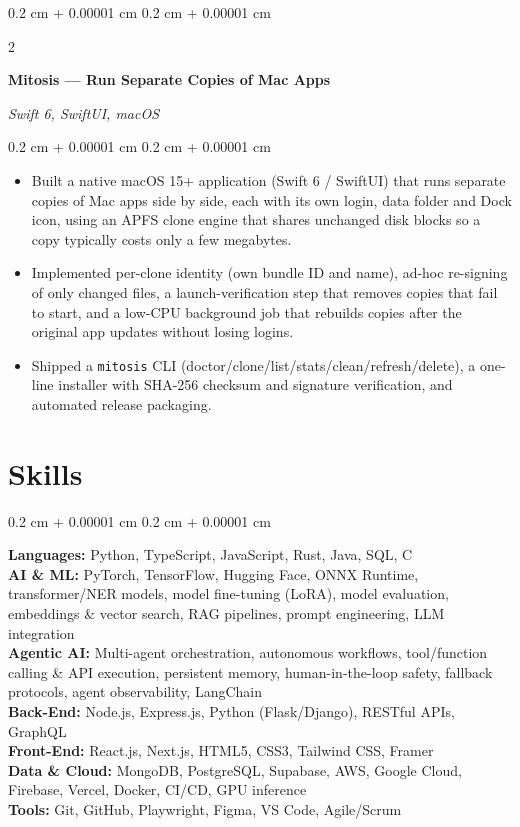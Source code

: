 \documentclass[10pt, letterpaper]{article}
\newenvironment{highlights}{
    \begin{itemize}[
        topsep=0.10 cm,
        parsep=0.10 cm,
        partopsep=0pt,
        itemsep=0pt,
        leftmargin=0.4 cm + 10pt
    ]
}{
    \end{itemize}
} %
\newenvironment{onecolentry}{
    \begin{adjustwidth}{
        0.2 cm + 0.00001 cm
    }{
        0.2 cm + 0.00001 cm
    }
}{
    \end{adjustwidth}
} %
\newenvironment{twocolentry}[2][]{
    \onecolentry
    \def\secondColumn{#2}
    \setcolumnwidth{\fill, 5.0 cm}
    \begin{paracol}{2}
}{
    \switchcolumn \raggedleft \secondColumn
    \end{paracol}
    \endonecolentry
} %
\let\hrefWithoutArrow\href
\renewcommand{\href}[2]{\hrefWithoutArrow{#1}{\ifthenelse{\equal{#2}{}}{ }{#2 }\raisebox{.15ex}{\footnotesize \faExternalLink*}}}
\begin{document}
    \vspace{0.12 cm}
    \begin{twocolentry}{
        \textit{Swift 6, SwiftUI, macOS}
    }
        \textbf{Mitosis --- Run Separate Copies of Mac Apps} \href{https://github.com/deadhearth01/Mitosis}{\faGithub}
    \end{twocolentry}
    \vspace{0.10 cm}
    \begin{onecolentry}
        \begin{highlights}
            \item Built a native macOS 15+ application (Swift 6 / SwiftUI) that runs separate copies of Mac apps side by side, each with its own login, data folder and Dock icon, using an APFS clone engine that shares unchanged disk blocks so a copy typically costs only a few megabytes.
            \item Implemented per-clone identity (own bundle ID and name), ad-hoc re-signing of only changed files, a launch-verification step that removes copies that fail to start, and a low-CPU background job that rebuilds copies after the original app updates without losing logins.
            \item Shipped a \texttt{mitosis} CLI (doctor/clone/list/stats/clean/refresh/delete), a one-line installer with SHA-256 checksum and signature verification, and automated release packaging.
        \end{highlights}
    \end{onecolentry}

    \section{Skills}
    \begin{onecolentry}
        \textbf{Languages:} Python, TypeScript, JavaScript, Rust, Java, SQL, C \\
        \textbf{AI \& ML:} PyTorch, TensorFlow, Hugging Face, ONNX Runtime, transformer/NER models, model fine-tuning (LoRA), model evaluation, embeddings \& vector search, RAG pipelines, prompt engineering, LLM integration \\
        \textbf{Agentic AI:} Multi-agent orchestration, autonomous workflows, tool/function calling \& API execution, persistent memory, human-in-the-loop safety, fallback protocols, agent observability, LangChain \\
        \textbf{Back-End:} Node.js, Express.js, Python (Flask/Django), RESTful APIs, GraphQL \\
        \textbf{Front-End:} React.js, Next.js, HTML5, CSS3, Tailwind CSS, Framer \\
        \textbf{Data \& Cloud:} MongoDB, PostgreSQL, Supabase, AWS, Google Cloud, Firebase, Vercel, Docker, CI/CD, GPU inference \\
        \textbf{Tools:} Git, GitHub, Playwright, Figma, VS Code, Agile/Scrum
    \end{onecolentry}
\end{document}
